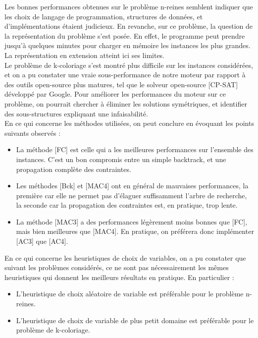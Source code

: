 \documentclass[14pt]{article}
\begin{document}
Les bonnes performances obtenues sur le problème n-reines semblent indiquer que les choix de langage de programmation, structures de données, et d'implémentations étaient judicieux. En revanche, sur ce problème, la question de la représentation du problème s'est posée. En effet, le programme peut prendre jusqu'à quelques minutes pour charger en mémoire les instances les plus grandes. La représentation en extension atteint ici ses limites.\\

Le problème de k-coloriage s'est montré plus difficile sur les instances considérées, et on a pu constater une vraie sous-performance de notre moteur par rapport à des outils open-source plus matures, tel que le solveur open-source [CP-SAT] développé par Google. Pour améliorer les performances du moteur sur ce problème, on pourrait chercher à éliminer les solutions symétriques, et identifier des sous-structures expliquant une infaisabilité.\\

En ce qui concerne les méthodes utilisées, on peut conclure en évoquant les points suivants observés :

\begin{itemize}
	\item La méthode [FC] est celle qui a les meilleures performances sur l'ensemble des instances. C'est un bon compromis entre un simple backtrack, et une propagation complète des contraintes.
	\item Les méthodes [Bck] et [MAC4] ont en général de mauvaises performances, la première car elle ne permet pas d'élaguer suffisamment l'arbre de recherche, la seconde car la propagation des contraintes est, en pratique, trop lente.
	\item La méthode [MAC3] a des performances légèrement moins bonnes que [FC], mais bien meilleures que [MAC4]. En pratique, on préférera donc implémenter [AC3] que [AC4].\\
\end{itemize}


En ce qui concerne les heuristiques de choix de variables, on a pu constater que suivant les problèmes considérés, ce ne sont pas nécessairement les mêmes heuristiques qui donnent les meilleurs résultats en pratique. En particulier : 

\begin{itemize}
	\item L'heuristique de choix aléatoire de variable est préférable pour le problème n-reines.
	\item L'heuristique de choix de variable de plus petit domaine est préférable pour le problème de k-coloriage.
\end{itemize}
\end{document}
